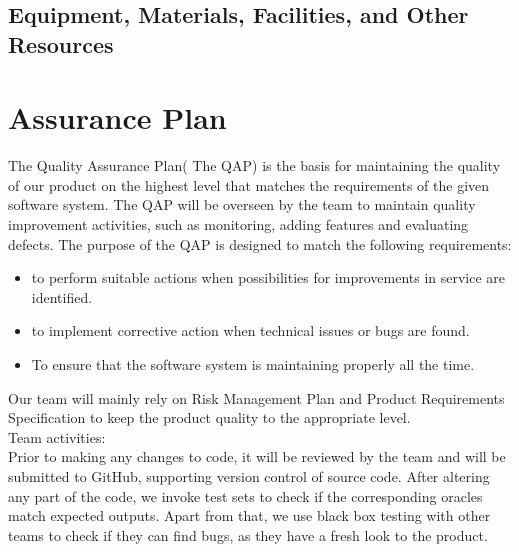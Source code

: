 \documentclass{l3deliverable}
\begin{document}
{%

\subsection{Equipment, Materials, Facilities, and Other Resources}


\section{Assurance Plan}


The Quality Assurance Plan( The QAP) is the basis for maintaining the quality of our product on the highest level that matches the requirements of the given software system. The QAP will be overseen by the team to maintain quality improvement activities, such as monitoring, adding features and evaluating defects. The purpose of the QAP is designed to match the following requirements:\\

\begin{itemize}
\item to perform suitable actions when possibilities for improvements in service are identified.\\
\item to implement corrective action when technical issues or bugs are found.\\
\item To ensure that the software system is maintaining properly all the time.\\
\end{itemize}

Our team will mainly rely on Risk Management Plan and Product Requirements Specification to keep the product quality to the appropriate level.\\

Team activities:\\

Prior to making any changes to code, it will be reviewed by the team and will be submitted to GitHub, supporting version control of source code. After altering any part of the code, we invoke test sets to check if the corresponding oracles match expected outputs. Apart from that, we use black box testing with other teams to check if they can find bugs, as they have a fresh look to the product.\\

}
\end{document}
